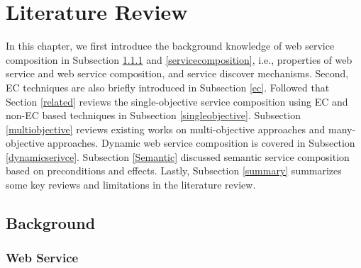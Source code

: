 \chapter{Literature Review}\label{C:review}
In this chapter, we first introduce the background knowledge of web service composition in Subsection \ref{service} and \ref{servicecomposition}, i.e., properties of web service and web service composition, and service discover mechanisms. Second, EC techniques are also briefly introduced in Subsection \ref{ec}. Followed that Section \ref{related} reviews the single-objective service composition using EC and non-EC based techniques in Subsection \ref{singleobjective}.  Subsection  \ref{multiobjective} reviews existing works on multi-objective approaches and many-objective approaches.  Dynamic web service composition is covered in Subsection \ref{dynamicserivce}. Subsection \ref{Semantic}  discussed semantic service composition based on preconditions and effects. Lastly, Subsection \ref{summary} summarizes some key reviews and limitations in the literature review.
\section{Background}\label{background}
\subsection{Web Service}\label{service}

